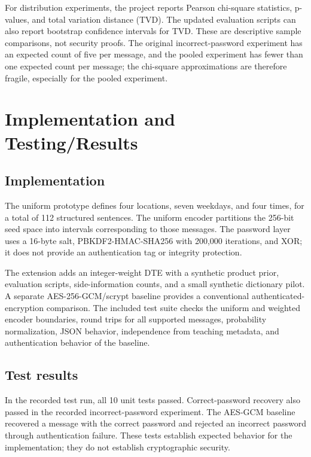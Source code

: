 \documentclass[sigconf,nonacm]{acmart}
\begin{document}
For distribution experiments, the project reports Pearson chi-square
statistics, p-values, and total variation distance (TVD). The updated
evaluation scripts can also report bootstrap confidence intervals for TVD.
These are descriptive sample comparisons, not security proofs. The original
incorrect-password experiment has an expected count of five per message, and
the pooled experiment has fewer than one expected count per message; the
chi-square approximations are therefore fragile, especially for the pooled
experiment.

\section{Implementation and Testing/Results}
\label{sec:results}

\subsection{Implementation}

The uniform prototype defines four locations, seven weekdays, and four times,
for a total of 112 structured sentences. The uniform encoder partitions the
256-bit seed space into intervals corresponding to those messages. The
password layer uses a 16-byte salt, PBKDF2-HMAC-SHA256 with 200{,}000
iterations, and XOR; it does not provide an authentication tag or integrity
protection.

The extension adds an integer-weight DTE with a synthetic product prior,
evaluation scripts, side-information counts, and a small synthetic
dictionary pilot. A separate AES-256-GCM/scrypt baseline provides a
conventional authenticated-encryption comparison. The included test suite
checks the uniform and weighted encoder boundaries, round trips for all
supported messages, probability normalization, JSON behavior, independence
from teaching metadata, and authentication behavior of the baseline.

\subsection{Test results}

In the recorded test run, all 10 unit tests passed. Correct-password
recovery also passed in the recorded incorrect-password experiment. The
AES-GCM baseline recovered a message with the correct password and rejected
an incorrect password through authentication failure. These tests establish
expected behavior for the implementation; they do not establish cryptographic
security.
\end{document}
